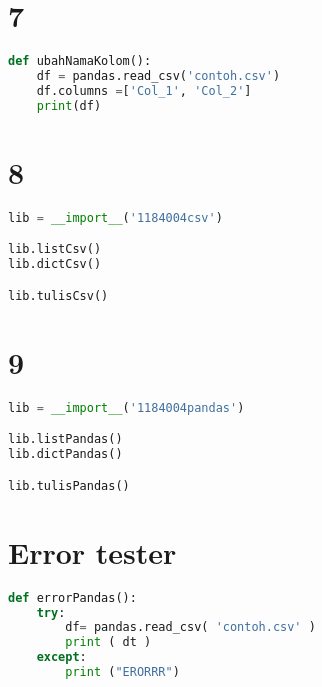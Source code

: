 \section*{7}
\begin{lstlisting}[language=Python]
def ubahNamaKolom():
    df = pandas.read_csv('contoh.csv')
    df.columns =['Col_1', 'Col_2'] 
    print(df)

\end{lstlisting}
\section*{8}
\begin{lstlisting}[language=Python]
lib = __import__('1184004csv')

lib.listCsv()
lib.dictCsv()

lib.tulisCsv()
\end{lstlisting}
\section*{9}
\begin{lstlisting}[language=Python]
lib = __import__('1184004pandas')

lib.listPandas()
lib.dictPandas()

lib.tulisPandas()
\end{lstlisting}

\section*{Error tester}
\begin{lstlisting}[language=Python]
def errorPandas(): 
    try:
        df= pandas.read_csv( 'contoh.csv' ) 
        print ( dt ) 
    except: 
        print ("ERORRR")
\end{lstlisting}